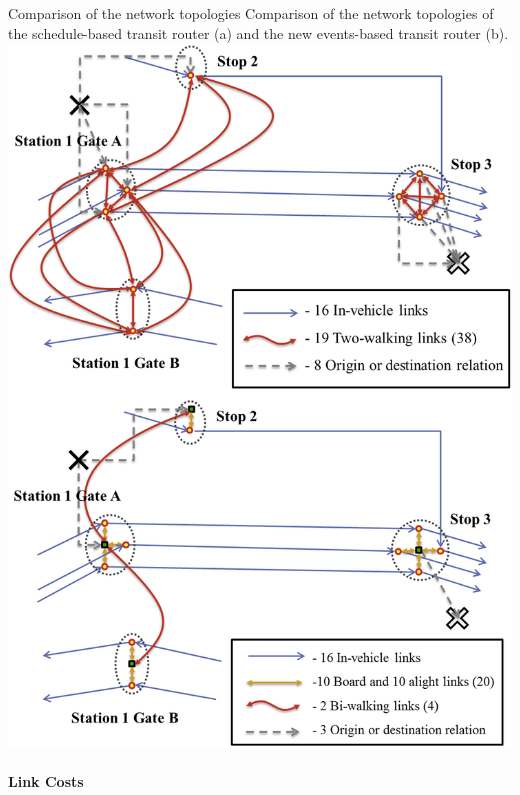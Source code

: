\createfigure
{Comparison of the network topologies}
{Comparison of the network topologies of the schedule-based transit router (a) and the new events-based transit router (b).}
{\label{fig:Networks}}
{\includegraphics[width=1.0\textwidth]{extending/figures/ebr/Networks.png}}
{}

\paragraph{Link Costs}

